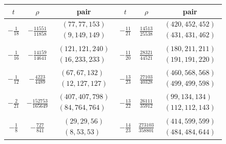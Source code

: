 \documentclass[11pt]{amsart}
\theoremstyle{plain}
\theoremstyle{remark}
\theoremstyle{plain}
\begin{document}
\begin{table}[H]
\centering
\setlength{\tabcolsep}{4pt}
\renewcommand{\arraystretch}{1.12}

\begin{tabular}{c|c|c||c|c|c}
\hline
$t$ & $\rho$ & pair
&
$t$ & $\rho$ & pair
\\
\hline

$-\frac{1}{18}$ &
$-\frac{11551}{11858}$ &
$\begin{array}{c}
(77,77,153)\\
(9,149,149)
\end{array}$
&
$-\frac{11}{21}$ &
$\frac{14513}{25538}$ &
$\begin{array}{c}
(420,452,452)\\
(431,431,462)
\end{array}$
\\
\hline

$-\frac{1}{16}$ &
$-\frac{14159}{14641}$ &
$\begin{array}{c}
(121,121,240)\\
(16,233,233)
\end{array}$
&
$-\frac{11}{20}$ &
$\frac{28321}{44521}$ &
$\begin{array}{c}
(180,211,211)\\
(191,191,220)
\end{array}$
\\
\hline

$-\frac{1}{12}$ &
$-\frac{4223}{4489}$ &
$\begin{array}{c}
(67,67,132)\\
(12,127,127)
\end{array}$
&
$-\frac{13}{23}$ &
$\frac{27103}{40328}$ &
$\begin{array}{c}
(460,568,568)\\
(499,499,598)
\end{array}$
\\
\hline

$-\frac{2}{21}$ &
$-\frac{152753}{165649}$ &
$\begin{array}{c}
(407,407,798)\\
(84,764,764)
\end{array}$
&
$-\frac{13}{22}$ &
$\frac{26111}{35912}$ &
$\begin{array}{c}
(99,134,134)\\
(112,112,143)
\end{array}$
\\
\hline

$-\frac{1}{8}$ &
$-\frac{727}{841}$ &
$\begin{array}{c}
(29,29,56)\\
(8,53,53)
\end{array}$
&
$-\frac{14}{23}$ &
$\frac{273103}{358801}$ &
$\begin{array}{c}
(414,599,599)\\
(484,484,644)
\end{array}$
\\
\hline


\end{tabular}
\end{table}
\end{document}
